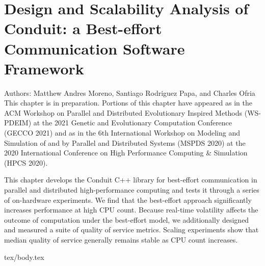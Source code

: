 \chapter{Design and Scalability Analysis of Conduit: a Best-effort Communication Software Framework}
\label{ch:conduit}

\noindent
Authors: Matthew Andres Moreno, Santiago Rodriguez Papa, and Charles Ofria \\
This chapter is in preparation.
Portions of this chapter have appeared as \citep{moreno2021conduit} in the ACM Workshop on Parallel and Distributed Evolutionary Inspired Methods (WS-PDEIM) at the 2021 Genetic and Evolutionary Computation Conference (GECCO 2021) and as \citep{moreno2020conduit} in the 6th International Workshop on Modeling and Simulation of and by Parallel and Distributed Systems (MSPDS 2020) at the 2020 International Conference on High Performance Computing \& Simulation (HPCS 2020).

This chapter develops the Conduit C++ library for best-effort communication in parallel and distributed high-performance computing and tests it through a series of on-hardware experiments.
We find that the best-effort approach significantly increases performance at high CPU count.
Because real-time volatility affects the outcome of computation under the best-effort model, we additionally designed and measured a suite of quality of service metrics.
Scaling experiments show that median quality of service generally remains stable as CPU count increases.

{tex/body.tex}
